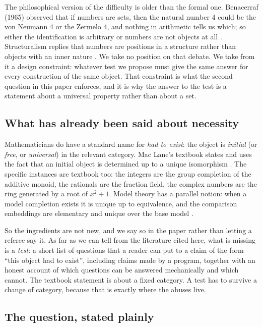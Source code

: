 \documentclass[aps,prd,preprint,superscriptaddress,amsmath,amssymb]{revtex4-2}
\begin{document}
The philosophical version of the difficulty is older than the formal one.
Benacerraf (1965) observed that if numbers are sets, then the natural number 4
could be the von Neumann 4 or the Zermelo 4, and nothing in arithmetic tells us
which; so either the identification is arbitrary or numbers are not objects at
all \cite{benacerraf1965}.  Structuralism replies that numbers are positions in a
structure rather than objects with an inner nature \cite{shapiro1997}.  We take
no position on that debate.  We take from it a design constraint: whatever test
we propose must give the same answer for every construction of the same object.
That constraint is what the second question in this paper enforces, and it is why
the answer to the test is a statement about a universal property rather than
about a set.

\subsection*{What has already been said about necessity}

Mathematicians do have a standard name for \emph{had to exist}: the object is
\emph{initial} (or \emph{free}, or \emph{universal}) in the relevant category.
Mac Lane's textbook states and uses the fact that an initial object is determined
up to a unique isomorphism \cite{MacLane1971}.  The specific instances are
textbook too: the integers are the group completion of the additive monoid,
the rationals are the fraction field, the complex numbers are the ring generated
by a root of $x^2+1$.  Model theory has a parallel notion: when a model completion exists it is unique
up to equivalence, and the comparison embeddings are elementary and unique over
the base model \cite{EklofSabbagh1971,Hodges1993}.

So the ingredients are not new, and we say so in the paper rather than letting a
referee say it.  As far as we can tell from the literature cited here, what is
missing is a \emph{test}: a short
list of questions that a reader can put to a claim of the form ``this object had
to exist'', including claims made by a program, together with an honest account
of which questions can be answered mechanically and which cannot.  The textbook
statement is about a fixed category.  A test has to survive a change of category,
because that is exactly where the abuses live.

\subsection*{The question, stated plainly}
\end{document}
